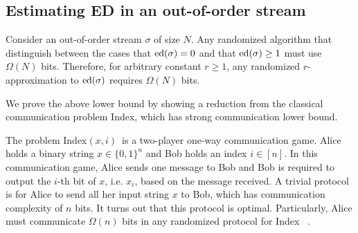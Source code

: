 \documentclass{llncs}
\newcommand{\ind}{{\sc Index}}
\newcommand{\ed}{{\rm ed}}
\begin{document}
\subsection{Estimating ED in an out-of-order stream}


\begin{theorem}\label{thm:lb_ed}
  Consider an out-of-order stream $\sigma$ of size $N$.
  Any randomized algorithm that distinguish between the cases that 
  $\ed(\sigma) = 0$ and that $\ed(\sigma) \ge 1$ must use $\Omega(N)$ bits.
  Therefore, for arbitrary constant $r \ge 1$, any randomized $r$-approximation to
  $\ed(\sigma)$ requires $\Omega(N)$ bits.
\end{theorem}

We prove the above lower bound by showing a reduction from the classical
communication problem \ind, which has strong communication lower bound. 

The problem \ind$(x,i)$~is a two-player one-way communication game.  Alice holds a binary
string $x \in \{0,1\}^n$ and Bob holds an index $i \in [n]$.
In this communication game, Alice sends one message to Bob and Bob is
required to output the $i$-th bit of $x$, i.e.  $x_i$, based on 
the message received.  A trivial protocol is for Alice to send all her
input string $x$ to Bob, which has communication complexity of $n$ bits.  It turns
out that this protocol is optimal.  Particularly, Alice must
communicate $\Omega(n)$ bits in any randomized protocol for \ind
~\cite{Abl96}.
\end{document}
